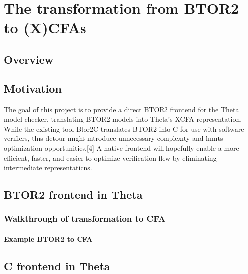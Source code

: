 \chapter{The transformation from BTOR2 to (X)CFAs }

\section{Overview}

\section{Motivation}\label{sec:motivation}

The goal of this project is to provide a direct BTOR2 frontend for the Theta model checker, translating BTOR2 models into Theta's XCFA representation. While the existing tool Btor2C translates BTOR2 into C for use with software verifiers, this detour might introduce unnecessary complexity and limits optimization opportunities.[4] A native frontend will hopefully enable a more efficient, faster, and easier-to-optimize verification flow by eliminating intermediate representations.

\section{BTOR2 frontend in Theta}


\subsection{Walkthrough of transformation to CFA}

\subsubsection{Example BTOR2 to CFA}

\section{C frontend in Theta}

